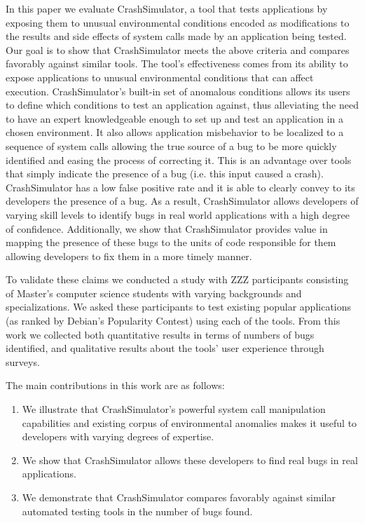 In this paper we evaluate CrashSimulator, a tool that tests applications by
exposing them to unusual environmental conditions encoded as modifications
to the results and side effects of system calls made by an application
being tested.  Our goal is to show that CrashSimulator meets the above
criteria and compares favorably against similar tools.  The tool's
effectiveness comes from its ability to expose applications to unusual
environmental conditions that can affect execution.  CrashSimulator's
built-in set of anomalous conditions allows its users to define which
conditions to test an application against, thus alleviating the need to
have an expert knowledgeable enough to set up and test an application in a
chosen environment.  It also allows application misbehavior to be localized
to a sequence of system calls allowing the true source of a bug to be more
quickly identified and easing the process of correcting it.  This is an
advantage over tools that simply indicate the presence of a bug (i.e.  this
input caused a crash).  CrashSimulator has a low false positive rate and it
is able to clearly convey to its developers the presence of a bug.  As a
result, CrashSimulator allows developers of varying skill levels to
identify bugs in real world applications with a high degree of confidence.
Additionally, we show that CrashSimulator provides value in mapping the
presence of these bugs to the units of code responsible for them allowing
developers to fix them in a more timely manner.

To validate these claims we conducted a study with ZZZ participants
consisting of Master's computer science students with varying backgrounds
and specializations.  We asked these participants to test existing popular
applications (as ranked by Debian's Popularity Contest) using each of the
tools.  From this work we collected both quantitative results in terms of
numbers of bugs identified, and qualitative results about the tools' user
experience through surveys.

The main contributions in this work are as follows:
\begin{enumerate}

\item We illustrate that CrashSimulator's powerful system call manipulation
    capabilities and existing corpus of environmental anomalies makes it
        useful to developers with varying degrees of expertise.

\item We show that CrashSimulator allows these developers to find real bugs
in real applications.

\item We demonstrate that CrashSimulator compares favorably against similar
automated testing tools in the number of bugs found.

\end{enumerate}
